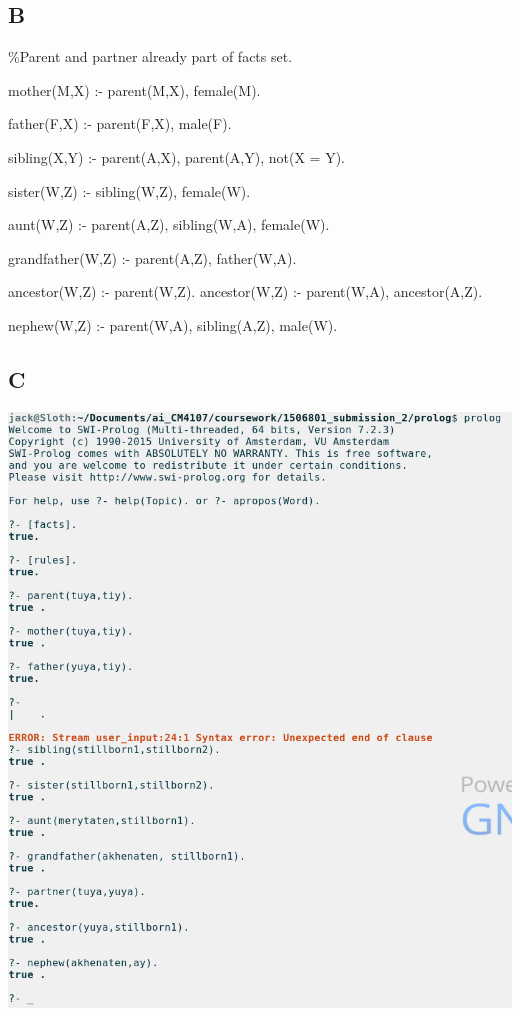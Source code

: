 \documentclass{article}
\begin{document}
\subsection*{B}

\%Parent and partner already part of facts set.

mother(M,X) :- parent(M,X), female(M).

father(F,X) :- parent(F,X), male(F).

sibling(X,Y) :- parent(A,X), parent(A,Y), not(X = Y).

sister(W,Z) :- sibling(W,Z), female(W).

aunt(W,Z) :- parent(A,Z), sibling(W,A), female(W).

grandfather(W,Z) :- parent(A,Z), father(W,A).

ancestor(W,Z) :- parent(W,Z).
ancestor(W,Z) :- parent(W,A), ancestor(A,Z).

nephew(W,Z) :- parent(W,A), sibling(A,Z), male(W).

\newpage
\subsection*{C}

\includegraphics[scale=0.5]{testing}
\end{document}
